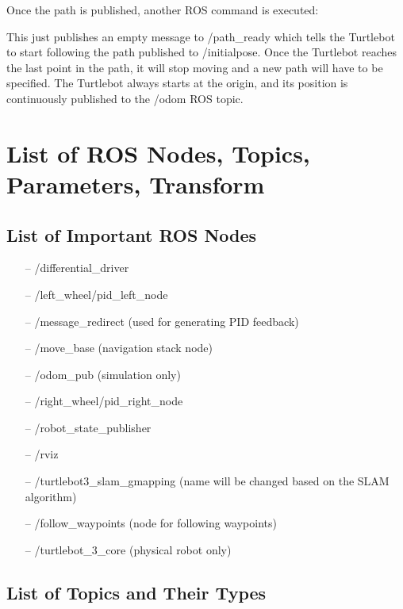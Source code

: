 \documentclass[12]{article}
\begin{document}
Once the path is published, another ROS command is executed:

This just publishes an empty message to /path\_ready which tells the Turtlebot to start following the path published to /initialpose. Once the Turtlebot reaches the last point in the path, it will stop moving and a new path will have to be specified. The Turtlebot always starts at the origin, and its position is continuously published to the /odom ROS topic. 

\newpage
\section{List of ROS Nodes, Topics, Parameters, Transform}
\subsection{List of Important ROS Nodes}


\begin{itemize}
    \item[--] /differential\_driver 
    \item[--] /left\_wheel/pid\_left\_node
    \item[--] /message\_redirect (used for generating PID feedback)
    \item[--] /move\_base (navigation stack node)
    \item[--] /odom\_pub (simulation only)
    \item[--] /right\_wheel/pid\_right\_node
    \item[--] /robot\_state\_publisher
    \item[--] /rviz
    \item[--] /turtlebot3\_slam\_gmapping (name will be changed based on the SLAM algorithm) 
    \item[--] /follow\_waypoints (node for following waypoints)
    \item[--] /turtlebot\_3\_core (physical robot only)
\end{itemize} 

\subsection{List of Topics and Their Types}
\end{document}
